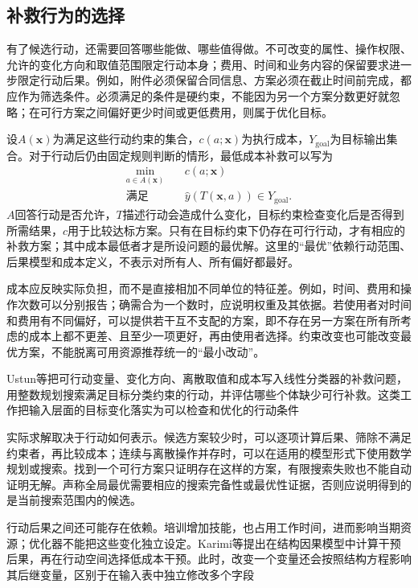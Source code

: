 \subsection{补救行为的选择}
\label{sec:interpretability-recourse-action}

有了候选行动，还需要回答哪些能做、哪些值得做。不可改变的属性、操作权限、允许的变化方向和取值范围限定行动本身；费用、时间和业务内容的保留要求进一步限定行动后果。例如，附件必须保留合同信息、方案必须在截止时间前完成，都应作为筛选条件。必须满足的条件是硬约束，不能因为另一个方案分数更好就忽略；在可行方案之间偏好更少时间或更低费用，则属于优化目标。

设$A(\bm{x})$为满足这些行动约束的集合，$c(a;\bm{x})$为执行成本，$Y_{\mathrm{goal}}$为目标输出集合。对于行动后仍由固定规则判断的情形，最低成本补救可以写为
\begin{equation}
 \begin{aligned}
 \min_{a\in A(\bm{x})}\quad &c(a;\bm{x})\\
 \text{满足}\quad &\hat y(T(\bm{x},a))\in Y_{\mathrm{goal}}.
 \end{aligned}
 \label{eq:interpretability-recourse}
\end{equation}
$A$回答行动是否允许，$T$描述行动会造成什么变化，目标约束检查变化后是否得到所需结果，$c$用于比较达标方案。只有在目标约束下仍存在可行行动，才有相应的补救方案；其中成本最低者才是所设问题的最优解。这里的“最优”依赖行动范围、后果模型和成本定义，不表示对所有人、所有偏好都最好。

成本应反映实际负担，而不是直接相加不同单位的特征差。例如，时间、费用和操作次数可以分别报告；确需合为一个数时，应说明权重及其依据。若使用者对时间和费用有不同偏好，可以提供若干互不支配的方案，即不存在另一方案在所有所考虑的成本上都不更差、且至少一项更好，再由使用者选择。约束改变也可能改变最优方案，不能脱离可用资源推荐统一的“最小改动”。

Ustun等把可行动变量、变化方向、离散取值和成本写入线性分类器的补救问题，用整数规划搜索满足目标分类约束的行动，并评估哪些个体缺少可行补救。这类工作把输入层面的目标变化落实为可以检查和优化的行动条件

实际求解取决于行动如何表示。候选方案较少时，可以逐项计算后果、筛除不满足约束者，再比较成本；连续与离散操作并存时，可以在适用的模型形式下使用数学规划或搜索。找到一个可行方案只证明存在这样的方案，有限搜索失败也不能自动证明无解。声称全局最优需要相应的搜索完备性或最优性证据，否则应说明得到的是当前搜索范围内的候选。

行动后果之间还可能存在依赖。培训增加技能，也占用工作时间，进而影响当期资源；优化器不能把这些变化独立设定。Karimi等提出在结构因果模型中计算干预后果，再在行动空间选择低成本干预。此时，改变一个变量还会按照结构方程影响其后继变量，区别于在输入表中独立修改多个字段

